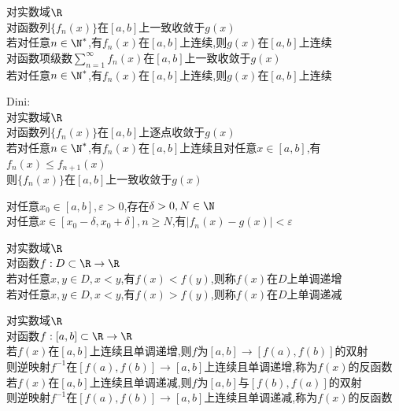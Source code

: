 \begin{dingli}
对实数域$\R$\\
对函数列$\{f_n(x)\}$在$[a,b]$上一致收敛于$g(x)$\\
若对任意$n\in \N^*$,有$f_n(x)$在$[a,b]$上连续,则$g(x)$在$[a,b]$上连续\\
对函数项级数$\sum\limits_{n=1}^{\infty}f_n(x)$在$[a,b]$上一致收敛于$g(x)$\\
若对任意$n\in \N^*$,有$f_n(x)$在$[a,b]$上连续,则$g(x)$在$[a,b]$上连续
\end{dingli}

\begin{dingli}
Dini:\\
对实数域$\R$\\
对函数列$\{f_n(x)\}$在$[a,b]$上逐点收敛于$g(x)$\\
若对任意$n\in \N^*$,有$f_n(x)$在$[a,b]$上连续且对任意$x\in[a,b]$,有$f_n(x)\leq f_{n+1}(x)$\\
则$\{f_n(x)\}$在$[a,b]$上一致收敛于$g(x)$
\end{dingli}

\begin{zhu}
对任意$x_0\in [a,b],\varepsilon>0$,存在$\delta>0,N\in\N$\\
对任意$x\in[x_0-\delta,x_0+\delta],n\geq N$,有$|f_n(x)-g(x)|<\varepsilon$
\end{zhu}

\begin{dingyi}
对实数域$\R$\\
对函数$f:D\subset \R \to \R$\\
若对任意$x,y\in D,x<y$,有$f(x)<f(y)$,则称$f(x)$在$D$上单调递增\\
若对任意$x,y\in D,x<y$,有$f(x)>f(y)$,则称$f(x)$在$D$上单调递减
\end{dingyi}

\begin{dingli}
对实数域$\R$\\
对函数$f:[a,b]\subset \R \to \R$\\
若$f(x)$在$[a,b]$上连续且单调递增,则$f$为$[a,b]\to [f(a),f(b)]$的双射\\
则逆映射$f^{-1}$在$[f(a),f(b)]\to [a,b]$上连续且单调递增,称为$f(x)$的反函数\\
若$f(x)$在$[a,b]$上连续且单调递减,则$f$为$[a,b]$与$[f(b),f(a)]$的双射\\
则逆映射$f^{-1}$在$[f(a),f(b)]\to [a,b]$上连续且单调递减,称为$f(x)$的反函数
\end{dingli}

